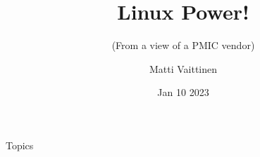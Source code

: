 \documentclass[10pt]{beamer}
\title{Linux Power!}
\subtitle{(From a view of a PMIC vendor)}
\author{Matti Vaittinen}
\institute{ROHM Semiconductors}
\date{Jan 10 2023}
\begin{document}
\begin{frame}
	\titlepage
\end{frame}



\begin{frame}{Topics}
\tableofcontents
\end{frame}

\end{document}

